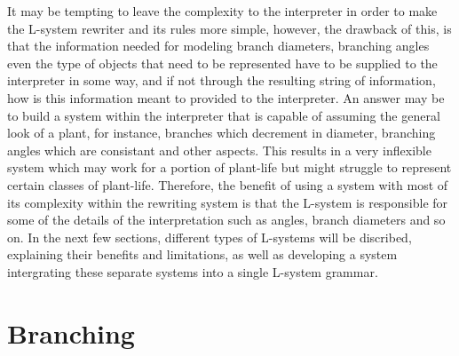 \begin{flushleft}
\vspace{5mm}

It may be tempting to leave the complexity to the interpreter in order to make the L-system rewriter and its rules more simple, however, the drawback of this, is that the information needed for modeling branch diameters, branching angles even the type of objects that need to be represented have to be supplied to the interpreter in some way, and if not through the resulting string of information, how is this information meant to provided to the interpreter. An answer may be to build a system within the interpreter that is capable of assuming the general look of a plant, for instance, branches which decrement in diameter, branching angles which are consistant and other aspects. This results in a very inflexible system which may work for a portion of plant-life but might struggle to represent certain classes of plant-life. Therefore, the benefit of using a system with most of its complexity within the rewriting system is that the L-system is responsible for some of the details of the interpretation such as angles, branch diameters and so on. In the next few sections, different types of L-systems will be discribed, explaining their benefits and limitations, as well as developing a system intergrating these separate systems into a single L-system grammar.   

\end{flushleft}

\section{Branching} \label{branching}

